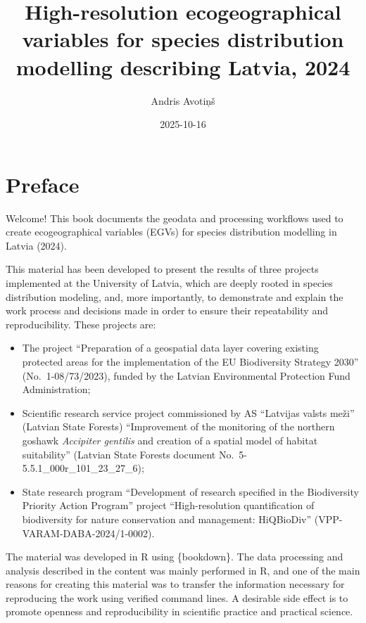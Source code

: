 \documentclass[
]{book}
\title{High-resolution ecogeographical variables for species distribution modelling describing Latvia, 2024}
\author{Andris Avotiņš}
\date{2025-10-16}
\begin{document}
\maketitle

{
\setcounter{tocdepth}{1}
\tableofcontents
}
\chapter*{Preface}\label{preface}

Welcome! This book documents the geodata and processing workflows used to create
ecogeographical variables (EGVs) for species distribution modelling in Latvia (2024).

This material has been developed to present the results of three projects
implemented at the University of Latvia, which are deeply rooted in species
distribution modeling, and, more importantly, to demonstrate and explain the
work process and decisions made in order to ensure their repeatability and
reproducibility. These projects are:

\begin{itemize}
\item
  The project ``Preparation of a geospatial data layer covering existing
  protected areas for the implementation of the EU Biodiversity Strategy
  2030'' (No.~1-08/73/2023), funded by the Latvian Environmental Protection Fund
  Administration;
\item
  Scientific research service project commissioned by AS ``Latvijas valsts
  meži'' (Latvian State Forests) ``Improvement of the monitoring of the northern
  goshawk \emph{Accipiter gentilis} and creation of a spatial model of habitat
  suitability'' (Latvian State Forests document No.~5-5.5.1\_000r\_101\_23\_27\_6);
\item
  State research program ``Development of research specified in the Biodiversity
  Priority Action Program'' project ``High-resolution quantification of biodiversity
  for nature conservation and management: HiQBioDiv'' (VPP-VARAM-DABA-2024/1-0002).
\end{itemize}

The material was developed in R using \{bookdown\}. The data processing and analysis
described in the content was mainly performed in R, and one of the main reasons
for creating this material was to transfer the information necessary for
reproducing the work using verified command lines. A desirable side effect
is to promote openness and reproducibility in scientific practice and practical
science.
\end{document}
